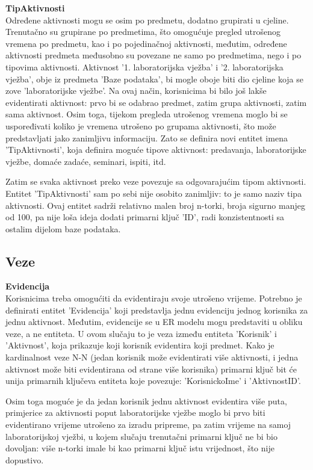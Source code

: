 \documentclass[times, utf8, zavrsni]{fer}
\begin{document}
\textbf{TipAktivnosti}\\
Određene aktivnosti mogu se osim po predmetu, dodatno grupirati u cjeline. Trenutačno su grupirane po predmetima, što omogućuje pregled utrošenog vremena po predmetu, kao i po pojedinačnoj aktivnosti, međutim, određene aktivnosti predmeta međusobno su povezane ne samo po predmetima, nego i po tipovima aktivnosti. Aktivnost '1. laboratorijska vježba' i '2. laboratorijska vježba', obje iz predmeta 'Baze podataka', bi mogle oboje biti dio cjeline koja se zove 'laboratorijske vježbe'. Na ovaj način, korisnicima bi bilo još lakše evidentirati aktivnost: prvo bi se odabrao predmet, zatim grupa aktivnosti, zatim sama aktivnost. Osim toga, tijekom pregleda utrošenog vremena moglo bi se uspoređivati koliko je vremena utrošeno po grupama aktivnosti, što može predstavljati jako zanimljivu informaciju. Zato se definira novi entitet imena 'TipAktivnosti', koja definira moguće tipove aktivnost: predavanja, laboratorijske vježbe, domaće zadaće, seminari, ispiti, itd.

Zatim se svaka aktivnost preko veze povezuje sa odgovarajućim tipom aktivnosti. Entitet 'TipAktivnosti' sam po sebi nije osobito zanimljiv: to je samo naziv tipa aktivnosti. Ovaj entitet sadrži relativno malen broj n-torki, broja sigurno manjeg od 100, pa nije loša ideja dodati primarni ključ 'ID', radi konzistentnosti sa ostalim dijelom baze podataka.

\subsection{Veze}
\textbf{Evidencija}\\
Korisnicima treba omogućiti da evidentiraju svoje utrošeno vrijeme. Potrebno je definirati entitet 'Evidencija' koji predstavlja jednu evidenciju jednog korisnika za jednu aktivnost. Međutim, evidencije se u ER modelu mogu predstaviti u obliku veze, a ne entiteta. U ovom slučaju to je veza između entiteta 'Korisnik' i 'Aktivnost', koja prikazuje koji korisnik evidentira koji predmet. Kako je kardinalnost veze N-N (jedan korisnik može evidentirati više aktivnosti, i jedna aktivnost može biti evidentirana od strane više korisnika) primarni ključ bit će unija primarnih ključeva entiteta koje povezuje: 'KorisnickoIme' i 'AktivnostID'.

Osim toga moguće je da jedan korisnik jednu aktivnost evidentira više puta, primjerice za aktivnosti poput laboratorijske vježbe moglo bi prvo biti evidentirano vrijeme utrošeno za izradu pripreme, pa zatim vrijeme na samoj laboratorijskoj vježbi, u kojem slučaju trenutačni primarni ključ ne bi bio dovoljan: više n-torki imale bi kao primarni ključ istu vrijednost, što nije dopustivo. 
\end{document}
